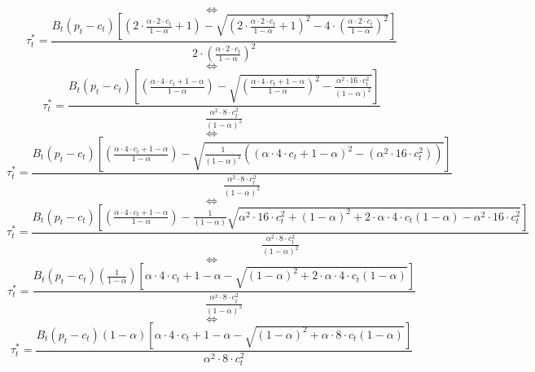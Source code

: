 \documentclass{article}
\begin{document}
$$\iff$$
\begin{equation*}
    \tau_{t}^{*}=\frac{B_{t}\left(p_{t}-c_{t}\right)\left[\left(2\cdot \frac{\alpha \cdot 2\cdot c_{t}}{1-\alpha}+1\right)-\sqrt{\left(2\cdot \frac{\alpha \cdot 2\cdot c_{t}}{1-\alpha}+1\right)^2-4\cdot \left(\frac{\alpha \cdot 2\cdot c_{t}}{1-\alpha}\right)^{2}}\right]}{2\cdot \left(\frac{\alpha \cdot 2\cdot c_{t}}{1-\alpha}\right)^{2}}
\end{equation*}
$$\iff$$
\begin{equation*}
    \tau_{t}^{*}=\frac{B_{t}\left(p_{t}-c_{t}\right)\left[\left(\frac{\alpha \cdot 4\cdot c_{t}+1-\alpha}{1-\alpha}\right)-\sqrt{\left(\frac{\alpha \cdot 4\cdot c_{t}+1-\alpha}{1-\alpha}\right)^2-\frac{\alpha^{2} \cdot 16\cdot c_{t}^{2}}{(1-\alpha)^{2}}}\right]}{\frac{\alpha^{2} \cdot 8\cdot c_{t}^{2}}{(1-\alpha)^{2}}}
\end{equation*}
$$\iff$$
\begin{equation*}
    \tau_{t}^{*}=\frac{B_{t}\left(p_{t}-c_{t}\right)\left[\left(\frac{\alpha \cdot 4\cdot c_{t}+1-\alpha}{1-\alpha}\right)-\sqrt{\frac{1}{(1-\alpha)^{2}}\left(\left(\alpha \cdot 4\cdot c_{t}+1-\alpha\right)^2-\left(\alpha^{2} \cdot 16\cdot c_{t}^{2}\right)\right)}\right]} {\frac{\alpha^{2} \cdot 8\cdot c_{t}^{2}}{(1-\alpha)^{2}}}
\end{equation*}
$$\iff$$
\begin{equation*}
    \tau_{t}^{*}=\frac{B_{t}\left(p_{t}-c_{t}\right)\left[\left(\frac{\alpha \cdot 4\cdot c_{t}+1-\alpha}{1-\alpha}\right)-\frac{1}{(1-\alpha)}\sqrt{\alpha^{2} \cdot 16\cdot c_{t}^{2}+(1-\alpha)^{2}+2\cdot \alpha\cdot4\cdot c_{t}(1-\alpha)-\alpha^{2} \cdot 16\cdot c_{t}^{2}}\right]} {\frac{\alpha^{2} \cdot 8\cdot c_{t}^{2}}{(1-\alpha)^{2}}}
\end{equation*}
$$\iff$$
\begin{equation*}
    \tau_{t}^{*}=\frac{B_{t}\left(p_{t}-c_{t}\right)(\frac{1}{1-\alpha})\left[{\alpha \cdot 4\cdot c_{t}+1-\alpha}-\sqrt{(1-\alpha)^{2}+2\cdot \alpha\cdot4\cdot c_{t}(1-\alpha)}\right]} {\frac{\alpha^{2} \cdot 8\cdot c_{t}^{2}}{(1-\alpha)^{2}}}
\end{equation*}
$$\iff$$
\begin{equation*}\tag{10}
    \tau_{t}^{*}=\frac{B_{t}\left(p_{t}-c_{t}\right)(1-\alpha)\left[{\alpha \cdot 4\cdot c_{t}+1-\alpha}-\sqrt{(1-\alpha)^{2}+\alpha\cdot8\cdot c_{t}(1-\alpha)}\right]} {\alpha^{2} \cdot 8\cdot c_{t}^{2}}
\end{equation*}
\end{document}
